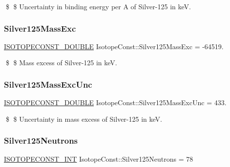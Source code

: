 \$ \$ Uncertainty in binding energy per A of Silver-\/125 in keV. \mbox{\label{group___isotope_const-_silver-_ag125_ga0ef745ab712f1f1ad4b1b5720cfe8add}} 
\subsubsection{\texorpdfstring{Silver125\+Mass\+Exc}{Silver125MassExc}}
{\footnotesize\ttfamily \mbox{\hyperlink{group___isotope_const-_macros_ga8f45a7272ce02c0b4c65c44636ed719a}{I\+S\+O\+T\+O\+P\+E\+C\+O\+N\+S\+T\+\_\+\+D\+O\+U\+B\+LE}} Isotope\+Const\+::\+Silver125\+Mass\+Exc = -\/64519.}

\$ \$ Mass excess of Silver-\/125 in keV. \mbox{\label{group___isotope_const-_silver-_ag125_ga200bca8eac851e64dae095c90a8d8029}} 
\subsubsection{\texorpdfstring{Silver125\+Mass\+Exc\+Unc}{Silver125MassExcUnc}}
{\footnotesize\ttfamily \mbox{\hyperlink{group___isotope_const-_macros_ga8f45a7272ce02c0b4c65c44636ed719a}{I\+S\+O\+T\+O\+P\+E\+C\+O\+N\+S\+T\+\_\+\+D\+O\+U\+B\+LE}} Isotope\+Const\+::\+Silver125\+Mass\+Exc\+Unc = 433.}

\$ \$ Uncertainty in mass excess of Silver-\/125 in keV. \mbox{\label{group___isotope_const-_silver-_ag125_gab0cdd29f9d1dfdae6dc08a6fffa3fe75}} 
\subsubsection{\texorpdfstring{Silver125\+Neutrons}{Silver125Neutrons}}
{\footnotesize\ttfamily \mbox{\hyperlink{group___isotope_const-_macros_ga5f18360b3e99483a35c32d789e62621c}{I\+S\+O\+T\+O\+P\+E\+C\+O\+N\+S\+T\+\_\+\+I\+NT}} Isotope\+Const\+::\+Silver125\+Neutrons = 78}

